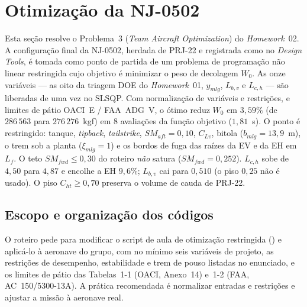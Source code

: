
\section{Otimização da NJ-0502}
\label{sec:nj0502}

\noindent
Esta seção resolve o Problema~3 (\emph{Team Aircraft Optimization}) do
\emph{Homework}~02. A configuração final da NJ-0502, herdada de PRJ-22 e
registrada como  no \emph{Design Tools}, é tomada como
ponto de partida de um problema de programação não linear restringida
cujo objetivo é minimizar o peso de decolagem $W_0$. As onze variáveis
--- as oito da triagem DOE do \emph{Homework}~01, $y_{mlg}$,
$L_{b,v}$ e $L_{c,h}$ --- são
liberadas de uma vez no SLSQP. Com normalização de variáveis e
restrições, e limites de pátio OACI~E / FAA~ADG~V, o ótimo reduz
$W_0$ em $3{,}59\%$ (de $286\,563$ para $276\,276$~kgf) em 8 avaliações
da função objetivo ($1{,}81$~s). O ponto é restringido: tanque,
\emph{tipback}, \emph{tailstrike}, $SM_{aft}=0{,}10$, $C_{Lv}$, bitola
($b_{mlg}=13{,}9$~m), o trem sob a planta ($\xi_{mlg}=1$) e os bordos de
fuga das raízes da EV e da EH em $L_f$. O teto $SM_{fwd}\le 0{,}30$ do
roteiro \emph{não} satura ($SM_{fwd}=0{,}252$). $L_{c,h}$ sobe de $4{,}50$
para $4{,}87$ e encolhe a EH $9{,}6\%$; $L_{b,v}$ cai para $0{,}510$ (o
piso $0{,}25$ não é usado). O piso $C_{ht}\ge 0{,}70$ preserva o volume de
cauda de PRJ-22.

\subsection{Escopo e organização dos códigos}
\label{sec:p3escopo}

O roteiro pede para modificar o script de aula de otimização restringida
() e aplicá-lo à aeronave do grupo, com no
mínimo seis variáveis de projeto, as restrições de desempenho,
estabilidade e trem de pouso listadas no enunciado, e os limites de pátio
das Tabelas~1-1 (OACI, Anexo~14) e~1-2 (FAA, AC~150/5300-13A). A prática
recomendada é normalizar entradas e restrições e ajustar a missão
à aeronave real.

